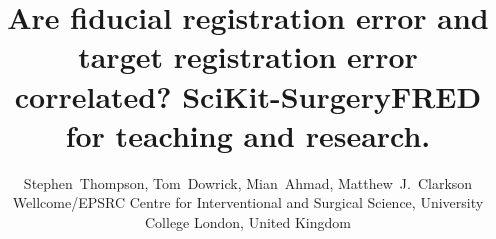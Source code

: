 \documentclass[a4paper, lmargin=1.925cm, rmargin=1.925cm,tmargin=2.54cm,bmargin=4.94cm]{spie}
\begin{document}
%
%
%
%
\title{Are fiducial registration error and target registration error correlated? SciKit-SurgeryFRED for teaching and research.}
%
%
\author{Stephen~Thompson, Tom~Dowrick, Mian~Ahmad, Matthew~J.~Clarkson
\skiplinehalf
{}Wellcome/EPSRC Centre for Interventional and Surgical Science, University College London, United Kingdom \\
}

%
%
%


\maketitle              %

\begin{abstract}

\end{abstract}








%



\end{document}

